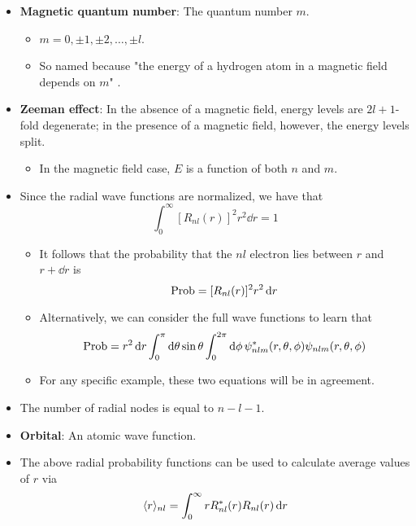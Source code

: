 \documentclass[../notes.tex]{subfiles}
\begin{document}
\begin{itemize}
    \item \textbf{Magnetic quantum number}: The quantum number $m$.
    \begin{itemize}
        \item $m=0,\pm 1,\pm 2,\dots,\pm l$.
        \item So named because "the energy of a hydrogen atom in a magnetic field depends on $m$" \parencite[209]{bib:McQuarrieSimon}.
    \end{itemize}
    \item \textbf{Zeeman effect}: In the absence of a magnetic field, energy levels are $2l+1$-fold degenerate; in the presence of a magnetic field, however, the energy levels split.
    \begin{itemize}
        \item In the magnetic field case, $E$ is a function of both $n$ and $m$.
    \end{itemize}
    \item Since the radial wave functions are normalized, we have that
    \begin{equation*}
        \int_0^\infty[R_{nl}(r)]^2r^2\dd{r} = 1
    \end{equation*}
    \begin{itemize}
        \item It follows that the probability that the $nl$ electron lies between $r$ and $r+\dd{r}$ is
        \begin{equation*}
            \operatorname{Prob} = [R_{nl}(r)]^2r^2\dd{r}
        \end{equation*}
        \item Alternatively, we can consider the full wave functions to learn that
        \begin{equation*}
            \operatorname{Prob} = r^2\dd{r}\int_0^\pi\dd{\theta}\sin\theta\int_0^{2\pi}\dd{\phi}\psi_{nlm}^*(r,\theta,\phi)\psi_{nlm}(r,\theta,\phi)
        \end{equation*}
        \item For any specific example, these two equations will be in agreement.
    \end{itemize}
    \item The number of radial nodes is equal to $n-l-1$.
    \item \textbf{Orbital}: An atomic wave function.
    \item The above radial probability functions can be used to calculate average values of $r$ via
    \begin{equation*}
        \prb{r}_{nl} = \int_0^\infty rR_{nl}^*(r)R_{nl}(r)\dd{r}

\end{equation*}
\end{itemize}
\end{document}
